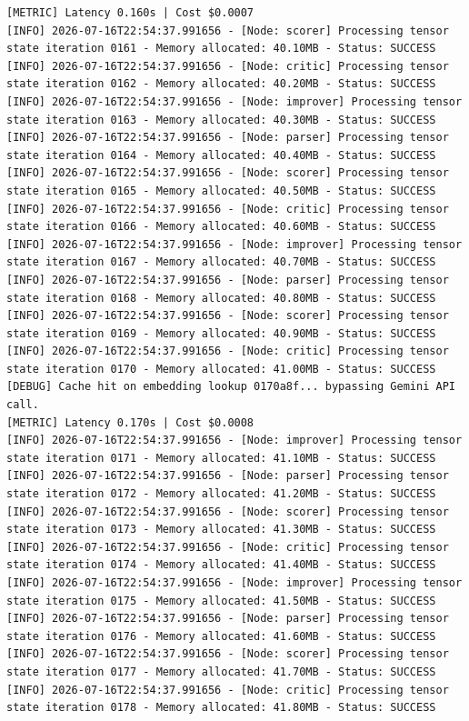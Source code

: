 \documentclass[10pt,journal,compsoc]{IEEEtran}
\begin{document}
\begin{verbatim}
[METRIC] Latency 0.160s | Cost $0.0007
[INFO] 2026-07-16T22:54:37.991656 - [Node: scorer] Processing tensor state iteration 0161 - Memory allocated: 40.10MB - Status: SUCCESS
[INFO] 2026-07-16T22:54:37.991656 - [Node: critic] Processing tensor state iteration 0162 - Memory allocated: 40.20MB - Status: SUCCESS
[INFO] 2026-07-16T22:54:37.991656 - [Node: improver] Processing tensor state iteration 0163 - Memory allocated: 40.30MB - Status: SUCCESS
[INFO] 2026-07-16T22:54:37.991656 - [Node: parser] Processing tensor state iteration 0164 - Memory allocated: 40.40MB - Status: SUCCESS
[INFO] 2026-07-16T22:54:37.991656 - [Node: scorer] Processing tensor state iteration 0165 - Memory allocated: 40.50MB - Status: SUCCESS
[INFO] 2026-07-16T22:54:37.991656 - [Node: critic] Processing tensor state iteration 0166 - Memory allocated: 40.60MB - Status: SUCCESS
[INFO] 2026-07-16T22:54:37.991656 - [Node: improver] Processing tensor state iteration 0167 - Memory allocated: 40.70MB - Status: SUCCESS
[INFO] 2026-07-16T22:54:37.991656 - [Node: parser] Processing tensor state iteration 0168 - Memory allocated: 40.80MB - Status: SUCCESS
[INFO] 2026-07-16T22:54:37.991656 - [Node: scorer] Processing tensor state iteration 0169 - Memory allocated: 40.90MB - Status: SUCCESS
[INFO] 2026-07-16T22:54:37.991656 - [Node: critic] Processing tensor state iteration 0170 - Memory allocated: 41.00MB - Status: SUCCESS
[DEBUG] Cache hit on embedding lookup 0170a8f... bypassing Gemini API call.
[METRIC] Latency 0.170s | Cost $0.0008
[INFO] 2026-07-16T22:54:37.991656 - [Node: improver] Processing tensor state iteration 0171 - Memory allocated: 41.10MB - Status: SUCCESS
[INFO] 2026-07-16T22:54:37.991656 - [Node: parser] Processing tensor state iteration 0172 - Memory allocated: 41.20MB - Status: SUCCESS
[INFO] 2026-07-16T22:54:37.991656 - [Node: scorer] Processing tensor state iteration 0173 - Memory allocated: 41.30MB - Status: SUCCESS
[INFO] 2026-07-16T22:54:37.991656 - [Node: critic] Processing tensor state iteration 0174 - Memory allocated: 41.40MB - Status: SUCCESS
[INFO] 2026-07-16T22:54:37.991656 - [Node: improver] Processing tensor state iteration 0175 - Memory allocated: 41.50MB - Status: SUCCESS
[INFO] 2026-07-16T22:54:37.991656 - [Node: parser] Processing tensor state iteration 0176 - Memory allocated: 41.60MB - Status: SUCCESS
[INFO] 2026-07-16T22:54:37.991656 - [Node: scorer] Processing tensor state iteration 0177 - Memory allocated: 41.70MB - Status: SUCCESS
[INFO] 2026-07-16T22:54:37.991656 - [Node: critic] Processing tensor state iteration 0178 - Memory allocated: 41.80MB - Status: SUCCESS

\end{verbatim}
\end{document}
